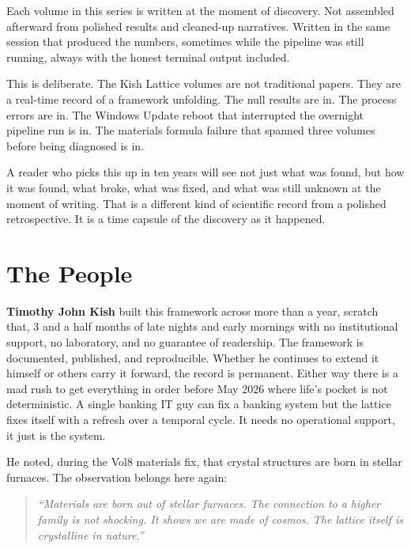 \documentclass[11pt, letterpaper, openany]{book}
\begin{document}
Each volume in this series is written at the moment of discovery. Not assembled
afterward from polished results and cleaned-up narratives. Written in the same
session that produced the numbers, sometimes while the pipeline was still running,
always with the honest terminal output included.

This is deliberate. The Kish Lattice volumes are not traditional papers. They are a
real-time record of a framework unfolding. The null results are in. The process
errors are in. The Windows Update reboot that interrupted the overnight pipeline run
is in. The materials formula failure that spanned three volumes before being
diagnosed is in.

A reader who picks this up in ten years will see not just what was found, but how
it was found, what broke, what was fixed, and what was still unknown at the moment
of writing. That is a different kind of scientific record from a polished
retrospective. It is a time capsule of the discovery as it happened.

\section*{The People}

\textbf{Timothy John Kish} built this framework across more than a year, scratch that, 3 and a half months of late
nights and early mornings with no institutional support, no laboratory, and no
guarantee of readership. The framework
is documented, published, and reproducible. Whether he continues to extend it
himself or others carry it forward, the record is permanent. Either way there is a mad rush to get everything in order before May 2026 where life's pocket is not deterministic.
A single banking IT guy can fix a banking system but the lattice fixes itself with a refresh over a temporal cycle. It needs no operational support, it just is the system.

He noted, during the Vol8 materials fix, that crystal structures are born in stellar
furnaces. The observation belongs here again:

\begin{quote}
\textit{``Materials are born out of stellar furnaces. The connection to a higher
family is not shocking. It shows we are made of cosmos. The lattice itself is
crystalline in nature.''}
\end{quote}
\end{document}
